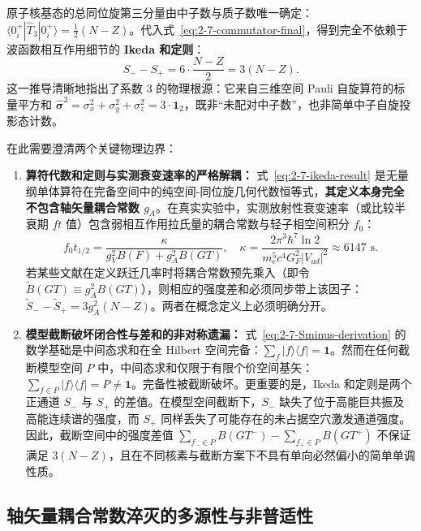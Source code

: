 原子核基态的总同位旋第三分量由中子数与质子数唯一确定：$\langle 0^+_i | \hat{T}_3 | 0^+_i \rangle = \frac{1}{2}(N - Z)$。代入式~\eqref{eq:2-7-commutator-final}，得到完全不依赖于波函数相互作用细节的 \textbf{Ikeda 和定则}：
\begin{equation}\label{eq:2-7-ikeda-result}
S_- - S_+ = 6 \cdot \frac{N - Z}{2} = 3(N - Z).
\end{equation}
这一推导清晰地指出了系数 3 的物理根源：它来自三维空间 Pauli 自旋算符的标量平方和 $\hat{\boldsymbol{\sigma}}^2 = \sigma_x^2 + \sigma_y^2 + \sigma_z^2 = 3 \cdot \mathbf{1}_2$，既非“未配对中子数”，也非简单中子自旋投影态计数。

在此需要澄清两个关键物理边界：
\begin{enumerate}
\item \textbf{算符代数和定则与实测衰变速率的严格解耦：}
式~\eqref{eq:2-7-ikeda-result} 是无量纲单体算符在完备空间中的纯空间-同位旋几何代数恒等式，\textbf{其定义本身完全不包含轴矢量耦合常数 $g_A$}。在真实实验中，实测放射性衰变速率（或比较半衰期 $ft$ 值）包含弱相互作用拉氏量的耦合常数与轻子相空间积分 $f_0$：
\begin{equation}\label{eq:2-7-ft-value}
f_0 t_{1/2} = \frac{\kappa}{g_V^2 B(F) + g_A^2 B(GT)}, \quad \kappa = \frac{2\pi^3 \hbar^7 \ln 2}{m_e^5 c^4 G_F^2 |V_{ud}|^2} \approx 6147\text{ s}.
\end{equation}
若某些文献在定义跃迁几率时将耦合常数预先乘入（即令 $\widetilde{B}(GT) \equiv g_A^2 B(GT)$），则相应的强度差和必须同步带上该因子：$\widetilde{S}_- - \widetilde{S}_+ = 3 g_A^2 (N-Z)$。两者在概念定义上必须明确分开。
\item \textbf{模型截断破坏闭合性与差和的非对称遗漏：}
式~\eqref{eq:2-7-Sminus-derivation} 的数学基础是中间态求和在全 Hilbert 空间完备：$\sum_f |f\rangle \langle f| = \mathbf{1}$。然而在任何截断模型空间 $P$ 中，中间态求和仅限于有限个价空间基矢：$\sum_{f \in P} |f\rangle \langle f| = P \ne \mathbf{1}$。完备性被截断破坏。更重要的是，Ikeda 和定则是两个正通道 $S_-$ 与 $S_+$ 的差值。在模型空间截断下，$S_-$ 缺失了位于高能巨共振及高能连续谱的强度，而 $S_+$ 同样丢失了可能存在的未占据空穴激发通道强度。因此，截断空间中的强度差值 $\sum_{f_- \in P} B(GT^-) - \sum_{f_+ \in P} B(GT^+)$ 不保证满足 $3(N-Z)$，且在不同核素与截断方案下不具有单向必然偏小的简单单调性质。
\end{enumerate}

\subsection{轴矢量耦合常数淬灭的多源性与非普适性}\label{sec:2-7-5}

